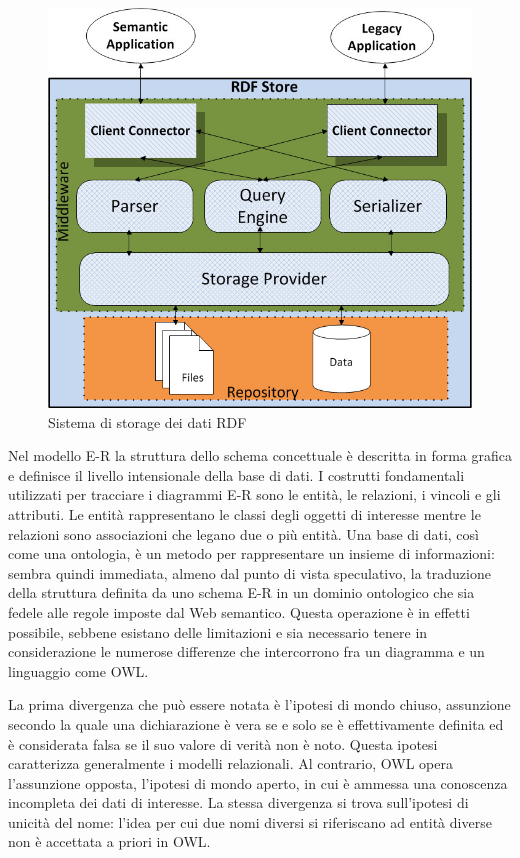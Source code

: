 \documentclass[Lau,binding=0.6cm,noexaminfo,oneside]{sapthesis}
\begin{document}
\begin{figure}[!ht]
  \centering
  \includegraphics[scale=0.35]{rdf.jpg}
  \caption{Sistema di storage dei dati RDF}
\end{figure}

Nel modello E-R la struttura dello schema concettuale è descritta in forma grafica e definisce il livello intensionale della base di dati. I costrutti fondamentali utilizzati per tracciare i diagrammi E-R sono le entità, le relazioni, i vincoli e gli attributi. Le entità rappresentano le classi degli oggetti di interesse mentre le relazioni sono associazioni che legano due o più entità. Una base di dati, così come una ontologia, è un metodo per rappresentare un insieme di informazioni: sembra quindi immediata, almeno dal punto di vista speculativo, la traduzione della struttura definita da uno schema E-R in un dominio ontologico che sia fedele alle regole imposte dal Web semantico. Questa operazione è in effetti possibile, sebbene esistano delle limitazioni e sia necessario tenere in considerazione le numerose differenze che intercorrono fra un diagramma e un linguaggio come OWL.\medskip

La prima divergenza che può essere notata è l'ipotesi di mondo chiuso, assunzione secondo la quale una dichiarazione è vera se e solo se è effettivamente definita ed è considerata falsa se il suo valore di verità non è noto. Questa ipotesi caratterizza generalmente i modelli relazionali. Al contrario, OWL opera l'assunzione opposta, l'ipotesi di mondo aperto, in cui è ammessa una conoscenza incompleta dei dati di interesse. La stessa divergenza si trova sull'ipotesi di unicità del nome: l'idea per cui due nomi diversi si riferiscano ad entità diverse non è accettata a priori in OWL.\medskip
\end{document}
